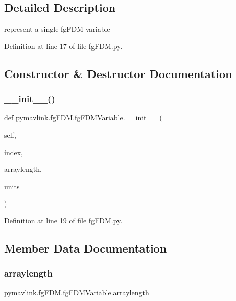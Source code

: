\subsection{Detailed Description}
\begin{DoxyVerb}represent a single fgFDM variable\end{DoxyVerb}
 

Definition at line 17 of file fg\+F\+D\+M.\+py.



\subsection{Constructor \& Destructor Documentation}
\mbox{\label{classpymavlink_1_1fgFDM_1_1fgFDMVariable_a78133d155a96ae5e4179b2303b4fac54}} 
\subsubsection{\texorpdfstring{\_\_init\_\_()}{\_\_init\_\_()}}
{\footnotesize\ttfamily def pymavlink.\+fg\+F\+D\+M.\+fg\+F\+D\+M\+Variable.\+\_\+\+\_\+init\+\_\+\+\_\+ (\begin{DoxyParamCaption}\item[{}]{self,  }\item[{}]{index,  }\item[{}]{arraylength,  }\item[{}]{units }\end{DoxyParamCaption})}



Definition at line 19 of file fg\+F\+D\+M.\+py.



\subsection{Member Data Documentation}
\mbox{\label{classpymavlink_1_1fgFDM_1_1fgFDMVariable_a2b1ccbcc1383da3cbb74593594acd483}} 
\subsubsection{\texorpdfstring{arraylength}{arraylength}}
{\footnotesize\ttfamily pymavlink.\+fg\+F\+D\+M.\+fg\+F\+D\+M\+Variable.\+arraylength}



